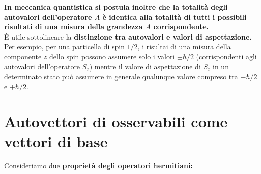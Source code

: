 \textbf{In meccanica quantistica si postula inoltre che la totalità degli autovalori dell'operatore $A$ è identica alla totalità di tutti i possibili risultati di una misura della grandezza $A$ corrispondente.}\\
È utile sottolineare la \textbf{distinzione tra autovalori e valori di aspettazione.} Per esempio, per una particella di spin $1/2$, i risultai di una misura della componente $z$ dello spin possono assumere solo i valori $\pm \hbar/2$ (corrispondenti agli autovalori dell'operatore $S_z$) mentre il valore di aspettazione di $S_z$ in un determinato stato può assumere in generale qualunque valore compreso tra $-\hbar /2$ e $+\hbar /2$.
\newpage
\section{Autovettori di osservabili come vettori di base}
Consideriamo due \textbf{proprietà degli operatori hermitiani:}
